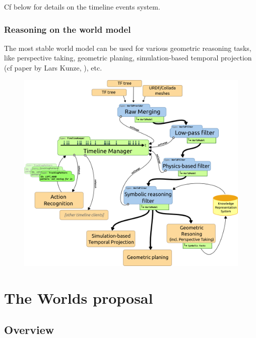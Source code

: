 \documentclass[a4paper]{article}
\begin{document}
Cf below for details on the timeline events system.

\subsubsection{Reasoning on the world model}

The most stable world model can be used for various geometric reasoning tasks,
like perspective taking, geometric planing, simulation-based temporal
projection (cf paper by Lars Kunze, \cite{Kunze2011a}), etc.

\begin{figure}[!h]
    \centering
    \includegraphics[scale=0.5]{images/spark2_archi2_5.png}
\end{figure}


\section{
  The Worlds proposal%
  \label{the-worlds-proposal}%
}



\subsection{
  Overview%
  \label{overview}%
}
\end{document}
